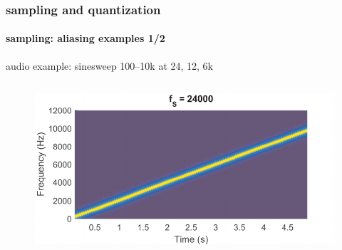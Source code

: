 	\begin{frame}\frametitle{sampling and quantization}\framesubtitle{sampling: aliasing examples 1/2}
        \vspace{-5mm}
        audio example: sinesweep 100--10k at 24, 12, 6k
        \begin{columns}
            \vspace{-5mm}
            \begin{figure}
                \includegraphics[scale=.35]{graph/sinealiasing_1}
            \end{figure}
            

\end{columns}
\end{frame}
